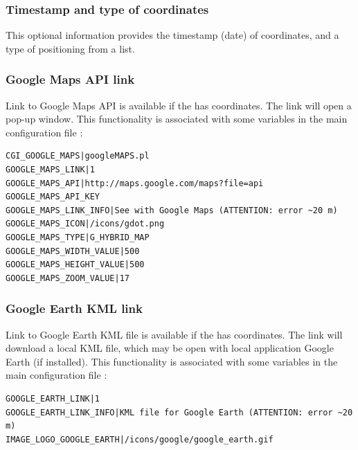 \subsubsection{Timestamp and type of coordinates}

This optional information provides the timestamp (date) of coordinates, and a type of positioning from a list.




\subsubsection{Google Maps API link}

Link to Google Maps API is available if the  has coordinates. The link will open a pop-up window. This functionality is associated with some variables in the main configuration file :

\begin{lstlisting}[title=\wofile{WEBOBS.rc} (excerpt)]
CGI_GOOGLE_MAPS|googleMAPS.pl
GOOGLE_MAPS_LINK|1
GOOGLE_MAPS_API|http://maps.google.com/maps?file=api
GOOGLE_MAPS_API_KEY
GOOGLE_MAPS_LINK_INFO|See with Google Maps (ATTENTION: error ~20 m)
GOOGLE_MAPS_ICON|/icons/gdot.png
GOOGLE_MAPS_TYPE|G_HYBRID_MAP
GOOGLE_MAPS_WIDTH_VALUE|500
GOOGLE_MAPS_HEIGHT_VALUE|500
GOOGLE_MAPS_ZOOM_VALUE|17
\end{lstlisting}

\subsubsection{Google Earth KML link}

Link to Google Earth KML file is available if the  has coordinates. The link will download a local KML file, which may be open with local application Google Earth (if installed). This functionality is associated with some variables in the main configuration file :

\begin{lstlisting}[title=\wofile{WEBOBS.rc} (excerpt)]
GOOGLE_EARTH_LINK|1
GOOGLE_EARTH_LINK_INFO|KML file for Google Earth (ATTENTION: error ~20 m)
IMAGE_LOGO_GOOGLE_EARTH|/icons/google/google_earth.gif
\end{lstlisting}

